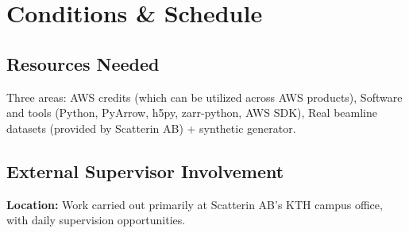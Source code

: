 \documentclass{article}
\begin{document}
\section{Conditions \& Schedule}

\subsection{Resources Needed}
Three areas: AWS credits (which can be utilized across AWS products), Software and tools (Python, PyArrow, h5py, zarr-python, AWS SDK), Real beamline datasets (provided by Scatterin AB) + synthetic generator.

\subsection{External Supervisor Involvement}
\textbf{Location:} Work carried out primarily at Scatterin AB’s KTH campus office, with daily supervision opportunities.
\end{document}
